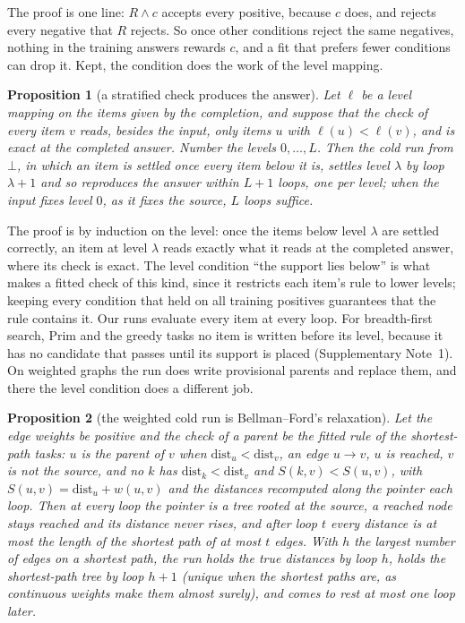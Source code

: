 \documentclass[10pt]{article}
\newtheorem{proposition}{Proposition}
\newcommand{\notyet}{\bot}
\begin{document}
The proof is one line: $R \wedge c$ accepts every positive, because $c$ does, and rejects every negative that $R$
rejects. So once other conditions reject the same negatives, nothing in the training answers rewards $c$, and a fit that
prefers fewer conditions can drop it. Kept, the condition does the work of the level mapping.

\begin{proposition}[a stratified check produces the answer]\label{prop:stratified}
Let $\ell$ be a level mapping on the items given by the completion, and suppose that the check of every item $v$ reads,
besides the input, only items $u$ with $\ell(u) < \ell(v)$, and is exact at the completed answer. Number the levels
$0,\ldots,L$. Then the cold run from $\notyet$, in which an item is settled once every item below it is, settles level
$\lambda$ by loop $\lambda+1$ and so reproduces the answer within $L+1$ loops, one per level; when the input fixes level
$0$, as it fixes the source, $L$ loops suffice.
\end{proposition}

The proof is by induction on the level: once the items below level $\lambda$ are settled correctly, an item at level
$\lambda$ reads exactly what it reads at the completed answer, where its check is exact. The level condition ``the support lies below'' is what
makes a fitted check of this kind, since it restricts each item's rule to lower levels; keeping every condition that held
on all training positives guarantees that the rule contains it. Our runs evaluate every item at every loop. For breadth-first search, Prim and the
greedy tasks no item is written before its level, because it has no candidate that passes until its support is placed
(Supplementary Note~1). On weighted graphs the run does write provisional parents and replace them, and there the level
condition does a different job.

\begin{proposition}[the weighted cold run is Bellman--Ford's relaxation]\label{prop:bf}
Let the edge weights be positive and the check of a parent be the fitted rule of the shortest-path tasks: $u$ is the
parent of $v$ when $\mathrm{dist}_u < \mathrm{dist}_v$, an edge $u \to v$, $u$ is reached, $v$ is not the source, and no
$k$ has $\mathrm{dist}_k < \mathrm{dist}_v$ and $S(k,v) < S(u,v)$, with $S(u,v) = \mathrm{dist}_u + w(u,v)$ and the
distances recomputed along the pointer each loop. Then at every loop the pointer is a tree rooted at the source, a
reached node stays reached and its distance never rises, and after loop $t$ every distance is at most the length of the
shortest path of at most $t$ edges. With $h$ the largest number of edges on a shortest path, the run holds the true
distances by loop $h$, holds the shortest-path tree by loop $h+1$ (unique when the shortest paths are, as continuous
weights make them almost surely), and comes to rest at most one loop later.
\end{proposition}
\end{document}
